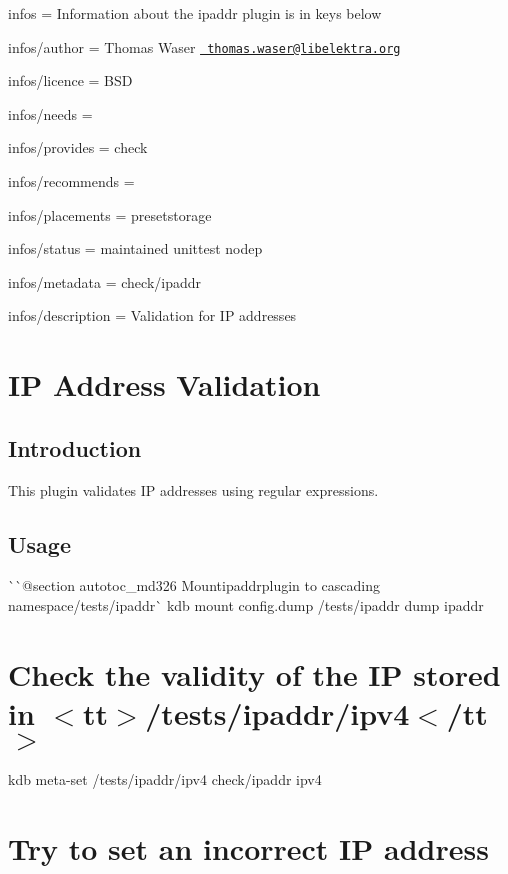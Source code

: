
\begin{DoxyItemize}
\item infos = Information about the ipaddr plugin is in keys below
\item infos/author = Thomas Waser \href{mailto:thomas.waser@libelektra.org}{\texttt{ thomas.\+waser@libelektra.\+org}}
\item infos/licence = B\+SD
\item infos/needs =
\item infos/provides = check
\item infos/recommends =
\item infos/placements = presetstorage
\item infos/status = maintained unittest nodep
\item infos/metadata = check/ipaddr
\item infos/description = Validation for IP addresses
\end{DoxyItemize}\hypertarget{autotoc_md323_src_plugins_ipaddr_README_md}{}\section{I\+P Address Validation}\label{autotoc_md323_src_plugins_ipaddr_README_md}
\hypertarget{autotoc_md323_autotoc_md324}{}\subsection{Introduction}\label{autotoc_md323_autotoc_md324}
This plugin validates IP addresses using regular expressions.\hypertarget{autotoc_md323_autotoc_md325}{}\subsection{Usage}\label{autotoc_md323_autotoc_md325}
\`{}\`{}{\ttfamily  @section autotoc\+\_\+md326 Mount}ipaddr{\ttfamily plugin to cascading namespace}/tests/ipaddr\`{} kdb mount config.\+dump /tests/ipaddr dump ipaddr\hypertarget{autotoc_md323_autotoc_md327}{}\section{Check the validity of the I\+P stored in $<$tt$>$/tests/ipaddr/ipv4$<$/tt$>$}\label{autotoc_md323_autotoc_md327}
kdb meta-\/set /tests/ipaddr/ipv4 check/ipaddr ipv4\hypertarget{autotoc_md323_autotoc_md328}{}\section{Try to set an incorrect I\+P address}\label{autotoc_md323_autotoc_md328}
